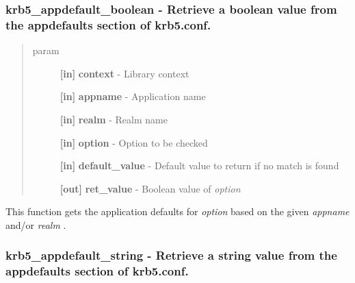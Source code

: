\documentclass[letterpaper,10pt,english]{sphinxmanual}
\begin{document}
\subsubsection{krb5\_appdefault\_boolean -  Retrieve a boolean value from the appdefaults section of krb5.conf.}
\label{appdev/refs/api/krb5_appdefault_boolean::doc}\label{appdev/refs/api/krb5_appdefault_boolean:krb5-appdefault-boolean-retrieve-a-boolean-value-from-the-appdefaults-section-of-krb5-conf}

\begin{fulllineitems}
\label{appdev/refs/api/krb5_appdefault_boolean:krb5_appdefault_boolean}
\end{fulllineitems}

\begin{quote}\begin{description}
\item[{param}] \leavevmode
\textbf{{[}in{]}} \textbf{context} - Library context

\textbf{{[}in{]}} \textbf{appname} - Application name

\textbf{{[}in{]}} \textbf{realm} - Realm name

\textbf{{[}in{]}} \textbf{option} - Option to be checked

\textbf{{[}in{]}} \textbf{default\_value} - Default value to return if no match is found

\textbf{{[}out{]}} \textbf{ret\_value} - Boolean value of \emph{option}

\end{description}\end{quote}

This function gets the application defaults for \emph{option} based on the given \emph{appname} and/or \emph{realm} .




{\hyperref[appdev/refs/api/krb5_appdefault_string:krb5_appdefault_string]{}}




\subsubsection{krb5\_appdefault\_string -  Retrieve a string value from the appdefaults section of krb5.conf.}
\label{appdev/refs/api/krb5_appdefault_string::doc}\label{appdev/refs/api/krb5_appdefault_string:krb5-appdefault-string-retrieve-a-string-value-from-the-appdefaults-section-of-krb5-conf}
\end{document}
